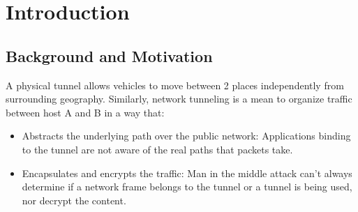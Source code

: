 \chapter{Introduction}
\minitoc\label{sec:introduction}\vspace{.5cm}

\section{Background and Motivation}
A physical tunnel allows vehicles to move between 2 places independently from surrounding geography. 
Similarly, network tunneling is a mean to organize traffic between host A and B in a way that:

\begin{itemize}
    \item Abstracts the underlying path over the public network: Applications binding to the tunnel are not aware of the real paths that packets take.
    \item Encapsulates and encrypts the traffic: Man in the middle attack can't always determine if a network frame belongs to the tunnel or a tunnel is being used, nor decrypt the content.
\end{itemize}

